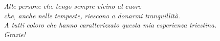 \documentclass[12pt,a4paper,oneside]{book}
\begin{document}
\evensidemargin 1.4cm
\oddsidemargin 1.4cm

	

	\hbox{}
\thispagestyle{empty}
\newpage 

	\thispagestyle{empty}
	\null {}
	\begin{flushright}
	\emph{ Alle persone che tengo sempre vicino al cuore \\ che, anche nelle tempeste, riescono a donarmi tranquillità. \\ A tutti coloro che hanno caratterizzato questa mia esperienza triestina. \\ Grazie! }
	\end{flushright}
	\null 

\hbox{}
\thispagestyle{empty}
\newpage 

	\tableofcontents


    

	
	
	
	
	
	
	

    \renewcommand{\bibsection}{\chapter*{References}}
    
    
\end{document}
